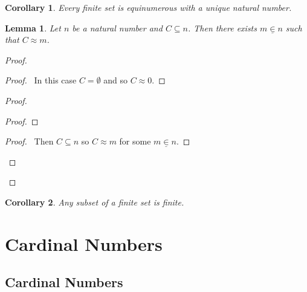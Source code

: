 \documentclass{report}
\let\qed\relax
\newtheorem{lemma}[axiom]{Lemma}
\newtheorem{corollary}{Corollary}[axiom]
\theoremstyle{definition}
\begin{document}
    \begin{corollary}
        Every finite set is equinumerous with a unique natural number.
    \end{corollary}

    \begin{lemma}
        Let $n$ be a natural number and $C \subseteq n$. Then there exists $m \underline{\in} n$ such that $C \approx m$.
    \end{lemma}

    \begin{proof}
        \pf
        \begin{proof}
            \pf\ In this case $C = \emptyset$ and so $C \approx 0$.
        \end{proof}
        \begin{proof}
            \begin{proof}
            \end{proof}
            \begin{proof}
                \pf\ Then $C \subseteq n$ so $C \approx m$ for some $m \underline{\in} n$.
            \end{proof}
        \end{proof}
        \qed
    \end{proof}

    \begin{corollary}
        Any subset of a finite set is finite.
    \end{corollary}

    \chapter{Cardinal Numbers}

    \section{Cardinal Numbers}
\end{document}

